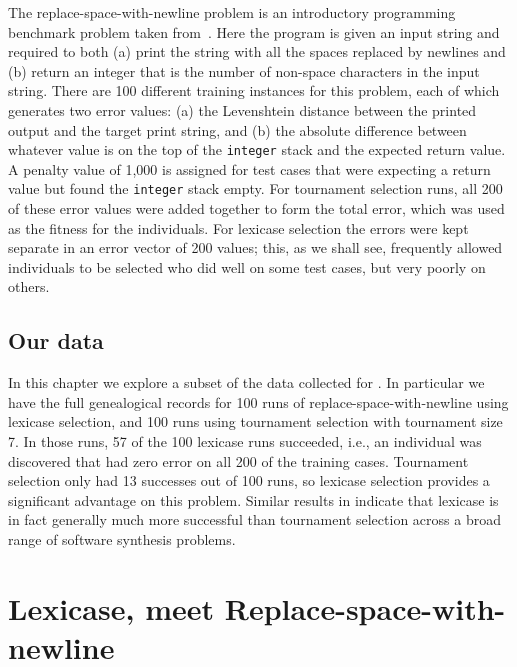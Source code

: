 The replace-space-with-newline problem is an introductory programming benchmark problem taken
from~\citep{Helmuth:2015:GECCO}. Here the program is given an input string and required to
both (a) print the string with all the spaces replaced by newlines and (b) return an integer that
is the number of non-space characters in the input string. There are 100 different training instances 
for this problem, each of which generates two error values: (a) the Levenshtein distance between
the printed output and the target print string, and (b) the absolute difference between
whatever value is on the top of the \texttt{integer} stack and the expected return value. A penalty
value of 1,000 is assigned for test cases that were expecting a return value but found the
\texttt{integer} stack empty.
For tournament selection runs, all 200 of these error values were added together to form the
total error, which was used as the fitness for the individuals. For lexicase selection the errors
were kept separate in an error vector of 200 values; this, as we shall see, frequently allowed individuals to be selected who did 
well on some test cases, but very poorly on others.

\subsection{Our data}
\label{sec:ourData}

In this chapter we explore a subset of the data collected for \citep{Helmuth:2015:GPTP}. In particular
we have the full genealogical records for 100 runs of replace-space-with-newline using 
lexicase selection, and 100 runs using tournament
selection with tournament size 7. In those
runs, 57 of the 100 lexicase runs succeeded, i.e., an individual was discovered that had zero
error on all 200 of the training cases. Tournament selection only
had 13 successes out of 100 runs, so
lexicase selection provides a significant advantage on this problem. Similar results in \citep{Helmuth:2015:GECCO}
indicate that lexicase is in fact generally much more successful than tournament selection across a broad range of
software synthesis problems.

\section{Lexicase, meet Replace-space-with-newline}
\label{sec:lexicaseRun}


